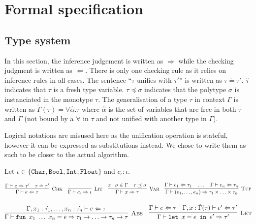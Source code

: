 \chapter{Formal specification}

\section{Type system}

In this section, the inference judgement is written as $\Rightarrow$ while the
checking judgment is written as $\Leftarrow$. There is only one checking rule as
it relies on inference rules in all cases. The sentence ``$\tau$ unifies with
$\tau'$'' is written as $\tau \doteq \tau'$. $\hat{\tau}$ indicates that $\tau$
is a fresh type variable. $\tau \preceq \sigma$ indicates that the polytype $\sigma$
is instanciated in the monotype $\tau$. The generalisation of a type $\tau$ in
context $\Gamma$ is written as $\tilde\Gamma(\tau) = \forall \hat{\alpha}. \tau$
where $\hat{\alpha}$ is the set of variables that are free in both $\tau$ and
$\Gamma$ (not bound by a $\forall$ in $\tau$ and not unified with another type
in $\Gamma$).

Logical notations are misused here as the unification operation is stateful,
however it can be expressed as substitutions instead. We chose to write them
as such to be closer to the actual algorithm.

Let $\iota \in \{\texttt{Char}, \texttt{Bool}, \texttt{Int}, \texttt{Float}\}$
and $c_\iota : \iota$.

\begin{equation*}
\infer[\textsc{Chk}]
	{\Gamma \vdash e \Leftarrow \tau}
	{\Gamma \vdash e \Rightarrow \tau'
	\quad \tau \doteq \tau'}\quad
\infer[\textsc{Lit}]{\Gamma \vdash c_\iota \Rightarrow \iota}{}\quad
\infer[\textsc{Var}]
	{\Gamma \vdash x \Rightarrow \tau}
    	{x : \sigma \in \Gamma
    	\quad \tau \preceq \sigma}\quad
\infer[\textsc{Tup}]
	{\Gamma \vdash (e_1, \ldots, e_n) \Rightarrow \tau_1 \times \ldots \times \tau_n}
	{\Gamma \vdash e_1 \Leftarrow \tau_1
	\quad\ldots
	\quad \Gamma \vdash e_n \Leftarrow \tau_n}
\end{equation*}

\begin{equation*}
\infer[\textsc{Abs}]
	{\Gamma \vdash \texttt{fun } x_1\;\ldots\;x_n = e \Rightarrow \tau_1 \rightarrow \ldots \rightarrow \tau_n \rightarrow \tau}
	{\Gamma, x_1 : \hat{\tau_1}, \ldots, x_n : \hat{\tau_n} \vdash e \Leftarrow \tau}\quad
\infer[\textsc{Let}]
	{\Gamma \vdash \texttt{let } x = e \texttt{ in } e' \Rightarrow \tau'}
	{\Gamma \vdash e \Leftarrow \tau
	\quad \Gamma, x: \tilde\Gamma(\tau) \vdash e' \Leftarrow \tau'}
\end{equation*}

